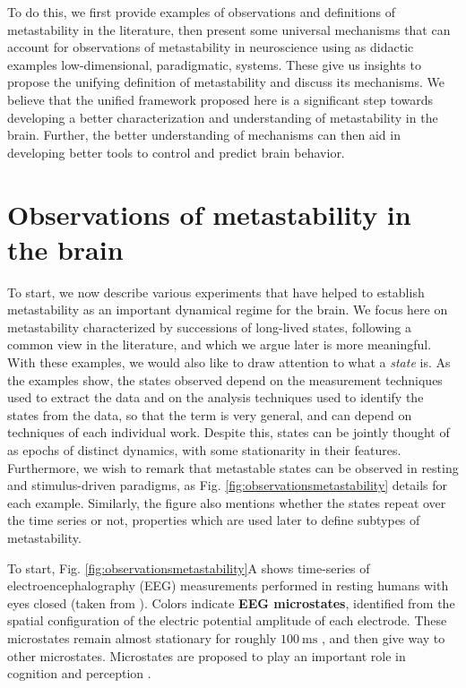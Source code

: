 \documentclass[reprint,onecolumn,superscriptaddress,showpacs,amsmath,amssymb,aps,floatfix]{revtex4-2}
\theoremstyle{definition}
\newcommand{\Emph}[1]{\textbf{#1}}
\begin{document}
To do this, we first provide examples of observations and definitions of metastability in the literature, then present some universal mechanisms that can account for observations of metastability in neuroscience using as didactic examples low-dimensional, paradigmatic, systems. These give us insights to propose the unifying definition of metastability and discuss its mechanisms. We believe that the unified framework proposed here is a significant step towards developing a better characterization and understanding of metastability in the brain. Further, the better understanding of mechanisms can then aid in developing better tools to control and predict brain behavior.


\section{Observations of metastability in the brain}
To start, we now describe various experiments that have helped to establish metastability as an important dynamical regime for the brain. We focus here on metastability characterized by successions of long-lived states, following a common view in the literature, and which we argue later is more meaningful. With these examples, we would also like to draw attention to what a \textit{state} is. As the examples show, the states observed depend on the measurement techniques used to extract the data and on the analysis techniques used to identify the states from the data, so that the term is very general, and can depend on techniques of each individual work. Despite this, states can be jointly thought of as epochs of distinct dynamics, with some stationarity in their features.
Furthermore, we wish to remark that metastable states can be observed in resting and stimulus-driven paradigms, as Fig. \ref{fig:observationsmetastability} details for each example. Similarly, the figure also mentions whether the states repeat over the time series or not, properties which are used later to define subtypes of metastability.

To start, Fig. \ref{fig:observationsmetastability}A shows time-series of electroencephalography (EEG) measurements performed in resting humans with eyes closed (taken from \cite{michel2017eeg}). Colors indicate \Emph{EEG microstates}, identified from the spatial configuration of the electric potential amplitude of each electrode. These microstates remain almost stationary for roughly $\SI{100}{\milli\second}$ \cite{vandeville2010eeg, lehmann1987eeg}, and then give way to other microstates. Microstates are proposed to play an important role in cognition and perception \cite{vandeville2010eeg, lehmann1987eeg, michel2017eeg}.
\end{document}
